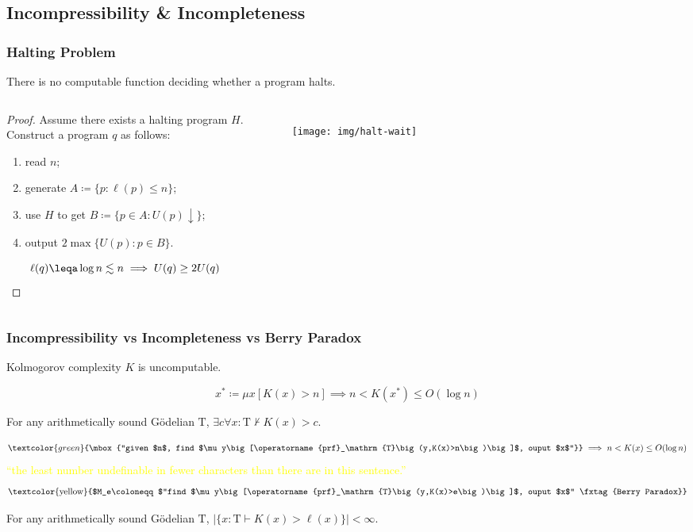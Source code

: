 \documentclass[UTF8,11pt,colorlinks,compress,openany]{beamer}%
\begin{document}
\subsection{Incompressibility \& Incompleteness}

\begin{frame}\frametitle{Halting Problem}
\setlength\abovedisplayskip{0pt}
\setlength\belowdisplayskip{0pt}
	\begin{theorem}
		There is no computable function deciding whether a program halts.
	\end{theorem}
\begin{columns}
\begin{proof}
	Assume there exists a halting program $H$.\\
	Construct a program $q$ as follows: 
	\begin{enumerate}
		\item read $n$;
		\item generate $A\coloneqq \{p:\ell(p)\leq n\}$;
		\item use $H$ to get $B\coloneqq \{p\in A: U(p)\downarrow\}$;
		\item output $2\max\{U(p): p\in B\}$.
	\end{enumerate}
\[\ell(q)\leqa\log n\lesssim n\implies U(q)\geq 2U(q)\]
\end{proof}
\begin{figure}[H]
	\texttt{[image: img/halt-wait]}
\end{figure}
\end{columns}
\end{frame}

\begin{frame}\frametitle{Incompressibility vs Incompleteness vs Berry Paradox}
	\begin{theorem}[Kolmogorov]
		Kolmogorov complexity $K$ is uncomputable.
	\end{theorem}\vspace{-11pt}
	\[x^*\coloneqq \mu x[K(x)>n]\implies n<K(x^*)\leq O(\log n)\]
	\begin{theorem}[Chaitin]
		For any arithmetically sound G\"odelian $\mathrm{T}$, $\exists c\forall x: \mathrm{T}\nvdash K(x)>c$.
	\end{theorem}\vspace{-17pt}
	\[\textcolor{green}{\mbox{``given $n$, find $\mu y\big[\operatorname{prf}_\mathrm{T}\big(y,K(x)>n\big)\big]$, ouput $x$''}}\implies n<K(x)\leq O(\log n)\]
	{\centering\small \textcolor{yellow}{``the least number undefinable in fewer characters than there are in this sentence.''}}
	\[\mbox{\textcolor{yellow}{$M_e\coloneqq $``find $\mu y\big[\operatorname{prf}_\mathrm{T}\big(y,K(x)>e\big)\big]$, ouput $x$'' \tag{Berry Paradox}}}\]
	\begin{theorem}[Chaitin]
		For any arithmetically sound G\"odelian $\mathrm{T}$, $\big|\big\{x: \mathrm{T}\vdash K(x)>\ell(x)\big\}\big|<\infty$.
	\end{theorem}
\end{frame}
\end{document}
